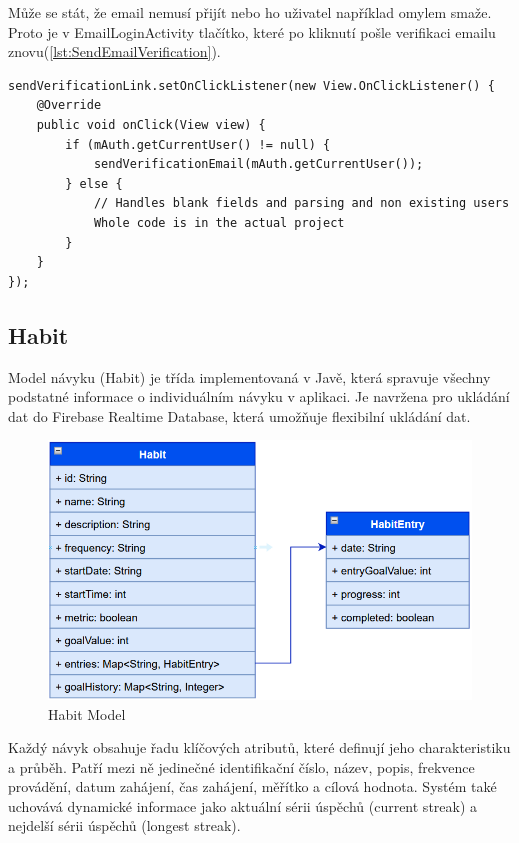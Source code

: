 Může se stát, že email nemusí přijít nebo ho uživatel například omylem smaže. Proto je v EmailLoginActivity tlačítko, které po kliknutí pošle verifikaci emailu znovu(\autoref{lst:SendEmailVerification}).

\begin{lstlisting}[style=javastyle,caption = {Send Email Verification},label = {lst:SendEmailVerification}]
sendVerificationLink.setOnClickListener(new View.OnClickListener() {
    @Override
    public void onClick(View view) {
        if (mAuth.getCurrentUser() != null) {
            sendVerificationEmail(mAuth.getCurrentUser());
        } else {
            // Handles blank fields and parsing and non existing users
            Whole code is in the actual project
        }
    }
});
\end{lstlisting}

\newpage

\subsection{Habit}
\hspace{14pt} Model návyku (Habit) je třída implementovaná v Javě, která spravuje všechny podstatné informace o individuálním návyku v aplikaci. Je navržena pro ukládání dat do Firebase Realtime Database, která umožňuje flexibilní ukládání dat.

\begin{figure}[H]
    \centering
    \includegraphics[width=1\linewidth]{images/HABIT.png}
    \caption{Habit Model}
    \label{fig:habit-model}
\end{figure}

Každý návyk obsahuje řadu klíčových atributů, které definují jeho charakteristiku a průběh. Patří mezi ně jedinečné identifikační číslo, název, popis, frekvence provádění, datum zahájení, čas zahájení, měřítko a cílová hodnota. Systém také uchovává dynamické informace jako aktuální sérii úspěchů (current streak) a nejdelší sérii úspěchů (longest streak).

